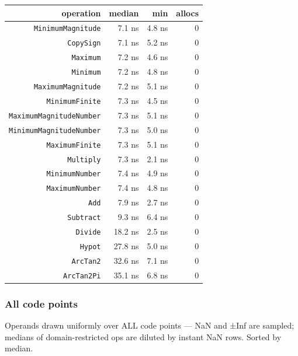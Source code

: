 \begin{table}[h]
\centering
\begin{tabulary}{\linewidth}{R R R R}
\toprule
operation & median & min & allocs \\
\toprule
\texttt{MinimumMagnitude} & 7.1 ns & 4.8 ns & 0 \\
\texttt{CopySign} & 7.1 ns & 5.2 ns & 0 \\
\texttt{Maximum} & 7.2 ns & 4.6 ns & 0 \\
\texttt{Minimum} & 7.2 ns & 4.8 ns & 0 \\
\texttt{MaximumMagnitude} & 7.2 ns & 5.1 ns & 0 \\
\texttt{MinimumFinite} & 7.3 ns & 4.5 ns & 0 \\
\texttt{MaximumMagnitudeNumber} & 7.3 ns & 5.1 ns & 0 \\
\texttt{MinimumMagnitudeNumber} & 7.3 ns & 5.0 ns & 0 \\
\texttt{MaximumFinite} & 7.3 ns & 5.1 ns & 0 \\
\texttt{Multiply} & 7.3 ns & 2.1 ns & 0 \\
\texttt{MinimumNumber} & 7.4 ns & 4.9 ns & 0 \\
\texttt{MaximumNumber} & 7.4 ns & 4.8 ns & 0 \\
\texttt{Add} & 7.9 ns & 2.7 ns & 0 \\
\texttt{Subtract} & 9.3 ns & 6.4 ns & 0 \\
\texttt{Divide} & 18.2 ns & 2.5 ns & 0 \\
\texttt{Hypot} & 27.8 ns & 5.0 ns & 0 \\
\texttt{ArcTan2} & 32.6 ns & 7.1 ns & 0 \\
\texttt{ArcTan2Pi} & 35.1 ns & 6.8 ns & 0 \\
\bottomrule
\end{tabulary}

\end{table}



\subsubsection{All code points}



\label{11499910499181378231}{}


Operands drawn uniformly over ALL code points — NaN and ±Inf are sampled; medians of domain-restricted ops are diluted by instant NaN rows. Sorted by median.




